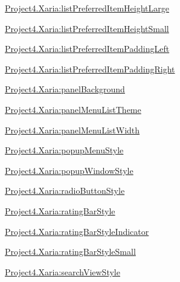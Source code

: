 {\ttfamily \hyperlink{classproject4_1_1xaria_1_1R_1_1styleable_a950e1a218f4b3586130f637e6ddfdcfb}{Project4.\+Xaria\+:list\+Preferred\+Item\+Height\+Large}}

{\ttfamily \hyperlink{classproject4_1_1xaria_1_1R_1_1styleable_af5bdb2bf5ceb768d50348bb1dc8c469d}{Project4.\+Xaria\+:list\+Preferred\+Item\+Height\+Small}}

{\ttfamily \hyperlink{classproject4_1_1xaria_1_1R_1_1styleable_aacb89a8e9a344b6bb4f794a6a33a8f1c}{Project4.\+Xaria\+:list\+Preferred\+Item\+Padding\+Left}}

{\ttfamily \hyperlink{classproject4_1_1xaria_1_1R_1_1styleable_a740af6d810089e93e6259d049551e18b}{Project4.\+Xaria\+:list\+Preferred\+Item\+Padding\+Right}}

{\ttfamily \hyperlink{classproject4_1_1xaria_1_1R_1_1styleable_ac551be8c36d995c3e33f28f517d7a324}{Project4.\+Xaria\+:panel\+Background}}

{\ttfamily \hyperlink{classproject4_1_1xaria_1_1R_1_1styleable_a1d930daeea752accaa963f15053cb96c}{Project4.\+Xaria\+:panel\+Menu\+List\+Theme}}

{\ttfamily \hyperlink{classproject4_1_1xaria_1_1R_1_1styleable_a43aec01657d9d84df72132aef49c3979}{Project4.\+Xaria\+:panel\+Menu\+List\+Width}}

{\ttfamily \hyperlink{classproject4_1_1xaria_1_1R_1_1styleable_abd4023d3d2a91ab681c1225563f99a45}{Project4.\+Xaria\+:popup\+Menu\+Style}}

{\ttfamily \hyperlink{classproject4_1_1xaria_1_1R_1_1styleable_af65cde560faf376a1a1d60f7eb858a6d}{Project4.\+Xaria\+:popup\+Window\+Style}}

{\ttfamily \hyperlink{classproject4_1_1xaria_1_1R_1_1styleable_a76cf668ccbb7d7b487042d61c9b4a2e1}{Project4.\+Xaria\+:radio\+Button\+Style}}

{\ttfamily \hyperlink{classproject4_1_1xaria_1_1R_1_1styleable_a89d18e267c360b44756771f540ab88f2}{Project4.\+Xaria\+:rating\+Bar\+Style}}

{\ttfamily \hyperlink{classproject4_1_1xaria_1_1R_1_1styleable_af3937cdc8aa3bd4b266711ff72f3eebb}{Project4.\+Xaria\+:rating\+Bar\+Style\+Indicator}}

{\ttfamily \hyperlink{classproject4_1_1xaria_1_1R_1_1styleable_aaf8de5a19d0b128396fe6e219e2988aa}{Project4.\+Xaria\+:rating\+Bar\+Style\+Small}}

{\ttfamily \hyperlink{classproject4_1_1xaria_1_1R_1_1styleable_ad924c1e6f178ccfee69b445c201c2e63}{Project4.\+Xaria\+:search\+View\+Style}}

